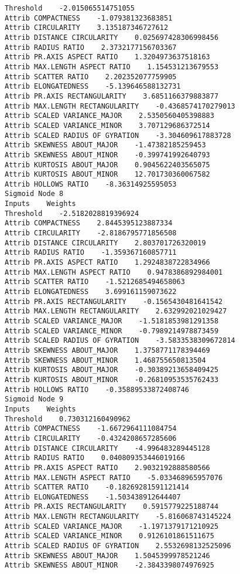 \documentclass[
	article,			%
	11pt,				%
	oneside,			%
	a4paper,			%
	english,			%
	brazil,				%
	sumario=tradicional
	]{abntex2}
\begin{document}
\begin{lstlisting}
Threshold    -2.015065514751055
Attrib COMPACTNESS    -1.079381323683851
Attrib CIRCULARITY    3.135187346727612
Attrib DISTANCE CIRCULARITY    0.025697428306998456
Attrib RADIUS RATIO    2.3732177156703367
Attrib PR.AXIS ASPECT RATIO    1.3204973637518163
Attrib MAX.LENGTH ASPECT RATIO    1.154531213679553
Attrib SCATTER RATIO    2.202352077759905
Attrib ELONGATEDNESS    -5.139646588132731
Attrib PR.AXIS RECTANGULARITY    3.6851166379883877
Attrib MAX.LENGTH RECTANGULARITY    -0.4368574170279013
Attrib SCALED VARIANCE_MAJOR    2.5350560405398883
Attrib SCALED VARIANCE_MINOR    3.707129686372514
Attrib SCALED RADIUS OF GYRATION    -3.304609617883728
Attrib SKEWNESS ABOUT_MAJOR    -1.47382185259453
Attrib SKEWNESS ABOUT_MINOR    -0.399741992640793
Attrib KURTOSIS ABOUT_MAJOR    0.9045622403565075
Attrib KURTOSIS ABOUT_MINOR    12.701730360067582
Attrib HOLLOWS RATIO    -8.36314925595053
Sigmoid Node 8
Inputs    Weights
Threshold    -2.5182028819396924
Attrib COMPACTNESS    2.8445395123887334
Attrib CIRCULARITY    -2.8186795771856508
Attrib DISTANCE CIRCULARITY    2.803701726320019
Attrib RADIUS RATIO    -1.359367160857711
Attrib PR.AXIS ASPECT RATIO    1.2924838722834966
Attrib MAX.LENGTH ASPECT RATIO    0.9478386892984001
Attrib SCATTER RATIO    -1.5212685494658063
Attrib ELONGATEDNESS    3.699161159073622
Attrib PR.AXIS RECTANGULARITY    -0.1565430481641542
Attrib MAX.LENGTH RECTANGULARITY    2.632992021029427
Attrib SCALED VARIANCE_MAJOR    -1.5181853981291358
Attrib SCALED VARIANCE_MINOR    -0.7989214978873459
Attrib SCALED RADIUS OF GYRATION    -3.5833538309672814
Attrib SKEWNESS ABOUT_MAJOR    1.3758771178394469
Attrib SKEWNESS ABOUT_MINOR    1.468755650813504
Attrib KURTOSIS ABOUT_MAJOR    -0.30389213658409425
Attrib KURTOSIS ABOUT_MINOR    -0.26810953535762433
Attrib HOLLOWS RATIO    -0.35889533872408746
Sigmoid Node 9
Inputs    Weights
Threshold    0.730312160490962
Attrib COMPACTNESS    -1.6672964111084754
Attrib CIRCULARITY    -0.4324208657285606
Attrib DISTANCE CIRCULARITY    -4.996483289445128
Attrib RADIUS RATIO    0.040809353446019166
Attrib PR.AXIS ASPECT RATIO    2.9032192888580566
Attrib MAX.LENGTH ASPECT RATIO    -5.033468965957076
Attrib SCATTER RATIO    -0.18269281591121414
Attrib ELONGATEDNESS    -1.503438912644407
Attrib PR.AXIS RECTANGULARITY    0.5915779225188744
Attrib MAX.LENGTH RECTANGULARITY    -5.816068743145224
Attrib SCALED VARIANCE_MAJOR    -1.1971379171210925
Attrib SCALED VARIANCE_MINOR    0.9126101861511675
Attrib SCALED RADIUS OF GYRATION    2.5532698132525096
Attrib SKEWNESS ABOUT_MAJOR    1.5045399978521246
Attrib SKEWNESS ABOUT_MINOR    -2.3843398074976925

\end{lstlisting}
\end{document}
